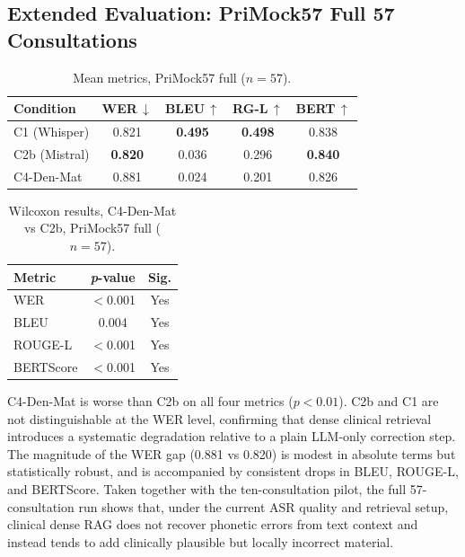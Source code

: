\documentclass[11pt,a4paper,twocolumn]{article}
\newcommand{\up}{\textcolor{green!60!black}{$\uparrow$}}
\newcommand{\dn}{\textcolor{red!70!black}{$\downarrow$}}
\newcommand{\bestnum}[1]{\textbf{#1}}
\begin{document}
\subsection{Extended Evaluation: PriMock57 Full 57 Consultations}
\label{sec:primock57_full}

\begin{table}[!t]
\centering
\caption{Mean metrics, PriMock57 full ($n{=}57$).}
\label{tab:primock57_57}
\footnotesize
\setlength{\tabcolsep}{3pt}
\renewcommand{\arraystretch}{1.05}
\begin{tabular}{lcccc}
\toprule
\textbf{Condition} & \textbf{WER\,\dn} & \textbf{BLEU\,\up} & \textbf{RG-L\,\up} & \textbf{BERT\,\up} \\
\midrule
C1 (Whisper)  & 0.821        & \bestnum{0.495} & \bestnum{0.498} & 0.838 \\
C2b (Mistral) & \bestnum{0.820} & 0.036        & 0.296        & \bestnum{0.840} \\
C4-Den-Mat    & 0.881        & 0.024        & 0.201        & 0.826 \\
\bottomrule
\end{tabular}
\end{table}

\begin{table}[!t]
\centering
\caption{Wilcoxon results, C4-Den-Mat vs C2b, PriMock57 full ($n{=}57$).}
\label{tab:primock57_wilcoxon}
\footnotesize
\setlength{\tabcolsep}{3.5pt}
\renewcommand{\arraystretch}{1.05}
\begin{tabular}{lcc}
\toprule
\textbf{Metric} & \textbf{\textit{p}-value} & \textbf{Sig.} \\
\midrule
WER       & \cellcolor{siggreen}$<$0.001 & Yes \\
BLEU      & \cellcolor{siggreen}0.004    & Yes \\
ROUGE-L   & \cellcolor{siggreen}$<$0.001 & Yes \\
BERTScore & \cellcolor{siggreen}$<$0.001 & Yes \\
\bottomrule
\end{tabular}
\end{table}

C4-Den-Mat is worse than C2b on all four metrics ($p < 0.01$). C2b and C1 are
not distinguishable at the WER level, confirming that dense clinical retrieval
introduces a systematic degradation relative to a plain LLM-only correction
step. The magnitude of the WER gap (0.881 vs 0.820) is modest in absolute
terms but statistically robust, and is accompanied by consistent drops in
BLEU, ROUGE-L, and BERTScore. Taken together with the ten-consultation pilot,
the full 57-consultation run shows that, under the current ASR quality and
retrieval setup, clinical dense RAG does not recover phonetic errors from text
context and instead tends to add clinically plausible but locally incorrect
material.
\end{document}
